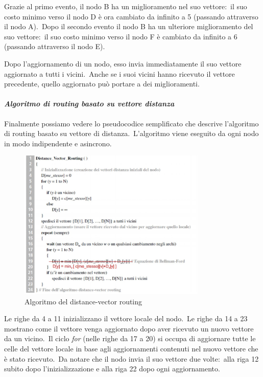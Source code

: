 Grazie al primo evento, il nodo B ha un miglioramento nel suo vettore:\ il suo costo minimo verso il nodo D è ora cambiato da infinito a 5 (passando attraverso il nodo A).\
Dopo il secondo evento il nodo B ha un ulteriore miglioramento del suo vettore:\ il suo costo minimo verso il nodo F è cambiato da infinito a 6 (passando attraverso il nodo E).

Dopo l'aggiornamento di un nodo, esso invia immediatamente il suo vettore aggiornato a tutti i vicini.\
Anche se i suoi vicini hanno ricevuto il vettore precedente, quello aggiornato può portare a dei miglioramenti.

\paragraph{\emph{Algoritmo di routing basato su vettore distanza}}

Finalmente possiamo vedere lo pseudocodice semplificato che descrive l'algoritmo di routing basato su vettore di distanza.\
L'algoritmo viene eseguito da ogni nodo in modo indipendente e asincrono.
\begin{figure}[H]
    \centering
    \includegraphics[width=0.8\textwidth]{immagini/Algoritmo_vectorDIstance.jpg}
    \caption*{Algoritmo del distance-vector routing}
\end{figure}
Le righe da 4 a 11 inizializzano il vettore locale del nodo.\
Le righe da 14 a 23 mostrano come il vettore venga aggiornato dopo aver ricevuto un nuovo vettore da un vicino.\
Il ciclo \emph{for} (nelle righe da 17 a 20) si occupa di aggiornare tutte le celle del vettore locale in base agli aggiornamenti contenuti nel nuovo vettore che è stato ricevuto.\
Da notare che il nodo invia il suo vettore due volte:\ alla riga 12 subito dopo l'inizializzazione e alla riga 22 dopo ogni aggiornamento.

